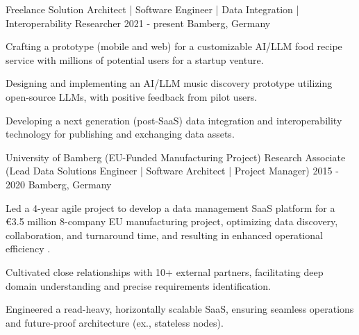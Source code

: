 {}


\begin{cventries}




    
        
  \cventry
    {Freelance} %
    {Solution Architect | Software Engineer | Data Integration | Interoperability Researcher}
    {2021 - present} %
    {Bamberg, Germany} %
    {
      \begin{cvitems} %
		\item {Crafting a prototype (mobile and web) for a customizable AI/LLM food recipe service with millions of potential users for a startup venture.}
		\item {Designing and implementing an AI/LLM music discovery prototype utilizing open-source LLMs, with positive feedback from pilot users.}
		\item {Developing a next generation (post-SaaS) data integration and interoperability technology for publishing and exchanging data assets.}
    \end{cvitems}
    }
    



    
        
  \cventry
    {University of Bamberg (EU-Funded Manufacturing Project)} %
    {Research Associate (Lead Data Solutions Engineer | Software Architect | Project Manager)}
    {2015 - 2020} %
    {Bamberg, Germany} %
    {
      \begin{cvitems} %
		\item {Led a 4-year agile project to develop a data management SaaS platform for a €3.5 million 8-company EU manufacturing project, optimizing data discovery, collaboration, and turnaround time, and resulting in enhanced operational efficiency .}
		\item {Cultivated close relationships with 10+ external partners, facilitating deep domain understanding and precise requirements identification.}
		\item {Engineered a read-heavy, horizontally scalable SaaS, ensuring seamless operations and future-proof architecture (ex., stateless nodes).}
      \end{cvitems}
    }


\end{cventries}
